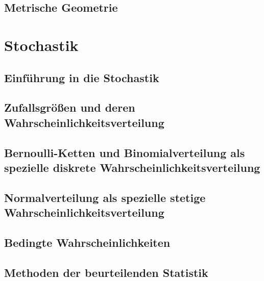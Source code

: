 \documentclass{article}
\begin{document}
        \subsection{Metrische Geometrie}

    \section{Stochastik}
        \subsection{Einführung in die Stochastik}
        \subsection{Zufallsgrößen und deren Wahrscheinlichkeitsverteilung}
        \subsection{Bernoulli-Ketten und Binomialverteilung als spezielle diskrete Wahrscheinlichkeitsverteilung}
        \subsection{Normalverteilung als spezielle stetige Wahrscheinlichkeitsverteilung}
        \subsection{Bedingte Wahrscheinlichkeiten}
        \subsection{Methoden der beurteilenden Statistik}
\end{document}
